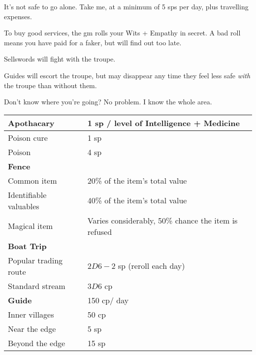 \begin{multicols*}{2}

\begin{boxtext}
  It's not safe to go alone.
  Take me, at a minimum of 5 \glspl{sp} per day, plus travelling expenses.
\end{boxtext}

To buy good services, the \gls{gm} rolls your Wits + Empathy in secret.
A bad roll means you have paid for a faker, but will find out too late.

Sellswords will fight with the troupe.

Guides will escort the troupe, but may disappear any time they feel less safe \emph{with} the troupe than without them.

\begin{boxtext}
  Don't know where you're going?
  No problem.
  I know the whole area.
\end{boxtext}

\noindent
\begin{tabularx}{\linewidth}{XX}

\textbf{Apothacary} & 1 \gls{sp} / level of Intelligence + Medicine \\\hline

Poison cure & 1 \gls{sp} \\

Poison & 4 \gls{sp} \\\hline

\textbf{Fence} & \\\hline

Common item & 20\% of the item's total value \\

Identifiable valuables & 40\% of the item's total value \\

Magical item & Varies considerably, 50\% chance the item is refused \\\hline

\textbf{Boat Trip} & \\\hline

Popular trading route & $2D6-2$ \gls{sp} (reroll each day) \\

Standard stream & $3D6$ \gls{cp} \\\hline

\textbf{Guide} &  150 \gls{cp}/ day \\\hline

  Inner \glspl{village} & 50 \gls{cp} \\
  Near the \gls{edge} & 5 \gls{sp} \\
  Beyond the \gls{edge} & 15 \gls{sp} \\


\end{tabularx}
\end{multicols*}
